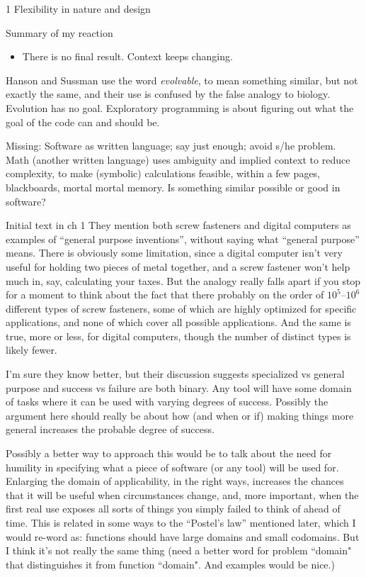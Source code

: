 \documentclass[11pt]{PalisadesLakesBook}
\begin{document}
\begin{plSection}{}
\begin{plSection}{1 Flexibility in nature and design}
\begin{plSection}{Summary of my reaction}
\begin{itemize}
  \item There is no final result. Context keeps changing.
  
\end{itemize}
Hanson and Sussman use the word \emph{evolvable}, 
to mean something similar, but not exactly the same,
and their use is confused by the false analogy to biology.
Evolution has no goal. 
Exploratory programming is about figuring out what the goal 
of the code can and should be.

Missing:
Software as written language; 
say just enough; avoid s/he problem.
Math (another written language) uses ambiguity
and implied context to reduce complexity,
to make (symbolic) calculations feasible,
within a few pages, blackboards, mortal mortal memory.
Is something similar possible or good in software? 

\end{plSection}%
\begin{plSection}{Initial text in ch 1}
They mention both screw fasteners and digital computers
as examples  of ``general purpose inventions'',
without saying what ``general purpose'' means.
There is obviously some limitation,
since a digital computer isn't very useful for holding two pieces 
of metal together, and a screw fastener won't help much in, say,
calculating your taxes. 
But the analogy really falls apart if you stop for a moment to
think about the fact that there probably on the order of 
$10^{5}\text{--}10^{6}$ different types of screw fasteners,
some  of which are highly optimized for specific applications,
and none of which cover all possible applications.
And the same is true, more or less, for digital computers,
though the number of distinct types is likely fewer.

I'm sure they know better, 
but their discussion suggests
specialized vs general purpose
and success vs failure are both binary.
Any tool will have some domain of tasks where it can be used
with varying degrees of success.
Possibly the argument here should really be about 
how (and when or if) making things more general increases
the probable degree of success. 

Possibly a better way to approach this
would be to talk about the need for humility in specifying
what a piece of software (or any tool) will be used for.
Enlarging the domain of applicability, in the right ways,
increases the chances that it will be useful when circumstances 
change, and, more important, 
when the first real use exposes all sorts of things 
you simply failed to think of ahead of time.
This is related in some ways to the ``Postel's law''
mentioned later, which I would re-word as:
functions should have large domains and small codomains.
But I think it's not really the same thing
(\TODO need a better word for problem ``domain"
that distinguishes it from function ``domain".
And examples would be nice.)


\end{plSection}
\end{plSection}
\end{plSection}
\end{document}

